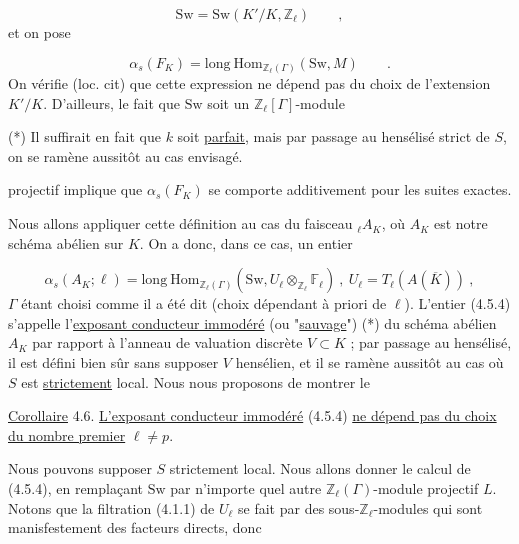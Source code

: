 \begin{equation}\tag{4.5.2}
\mathrm{Sw} = \mathrm{Sw}(K'/K,\mathbb{Z}_\ell) \qquad ,
\end{equation}
et on pose

\begin{equation}\tag{4.5.3}
\alpha_s(F_K) = \mathrm{long}\ \mathrm{Hom}_{\mathbb{Z}_\ell(\Gamma)}(\mathrm{Sw},M) \qquad .
\end{equation}
On vérifie (loc. cit) que cette expression ne dépend pas du choix de l'extension $K'/K$. D'ailleurs, le fait que $\mathrm{Sw}$ soit un $\mathbb{Z}_\ell[\Gamma]$-module

(*) Il suffirait en fait que $k$ soit \underline{parfait}, mais par passage au hensélisé strict de $S$, on se ramène aussitôt au cas envisagé.



projectif implique que $\alpha_s(F_K)$ se comporte additivement pour les suites exactes.

Nous allons appliquer cette définition au cas du faisceau ${}_\ell A_K$, où $A_K$ est notre schéma abélien sur $K$. On a donc, dans ce cas, un entier

\begin{equation}\tag{4.5.4}
\alpha_s(A_K;\ell) = \mathrm{long}\ \mathrm{Hom}_{\mathbb{Z}_\ell(\Gamma)}(\mathrm{Sw},U_\ell \otimes_{\mathbb{Z}_\ell} \mathbb{F}_\ell) \ , \ U_\ell = T_\ell(A(\overline{K})) \ ,
\end{equation}
$\Gamma$ étant choisi comme il a été dit (choix dépendant à priori de $\ell$). L'entier (4.5.4) s'appelle l'\underline{exposant conducteur immodéré} (ou "\underline{sauvage}") (*) du schéma abélien $A_K$ par rapport à l'anneau de valuation discrète $V \subset K$ ; par passage au hensélisé, il est défini bien sûr sans supposer $V$ hensélien, et il se ramène aussitôt au cas où $S$ est \underline{strictement} local. Nous nous proposons de montrer le

\underline{Corollaire} 4.6. \underline{L'exposant conducteur immodéré} (4.5.4) \underline{ne dépend pas du choix du nombre premier} $\ell \neq p$.

Nous pouvons supposer $S$ strictement local. Nous allons donner le calcul de (4.5.4), en remplaçant $\mathrm{Sw}$ par n'importe quel autre $\mathbb{Z}_\ell(\Gamma)$-module projectif $L$. Notons que la filtration (4.1.1) de $U_\ell$ se fait par des sous-$\mathbb{Z}_\ell$-modules qui sont manisfestement des facteurs directs, donc

